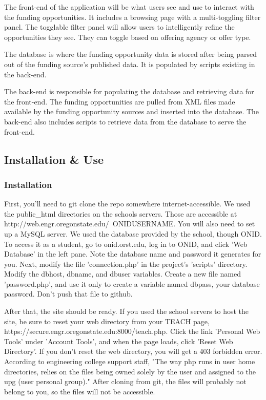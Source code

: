 \documentclass[onecolumn]{IEEEtran}
\begin{document}
The front-end of the application will be what users see and use to interact with the funding opportunities. It includes a browsing page with a multi-toggling filter panel. The togglable filter panel will allow users to intelligently refine the opportunities they see. They can toggle based on offering agency or offer type. 

The database is where the funding opportunity data is stored after being parsed out of the funding source's published data. It is populated by scripts existing in the back-end. 

The back-end is responsible for populating the database and retrieving data for the front-end. The funding opportunities are pulled from XML files made available by the funding opportunity sources and inserted into the database. The back-end also includes scripts to retrieve data from the database to serve the front-end. 

\subsection{Installation \& Use}
\subsubsection{Installation}
First, you'll need to git clone the repo somewhere internet-accessible. We used the public\_html directories on the schools servers. Those are accessible at http://web.engr.oregonstate.edu/~ONIDUSERNAME. You will also need to set up a MySQL server. We used the database provided by the school, though ONID. To access it as a student, go to onid.orst.edu, log in to ONID, and click 'Web Database' in the left pane. Note the database name and password it generates for you. Next, modify the file 'connection.php' in the project's 'scripts' directory. Modify the dbhost, dbname, and dbuser variables. Create a new file named 'password.php', and use it only to create a variable named dbpass, your database password. Don't push that file to github.  

After that, the site should be ready. If you used the school servers to host the site, be sure to reset your web directory from your TEACH page, https://secure.engr.oregonstate.edu:8000/teach.php. Click the link 'Personal Web Tools' under 'Account Tools', and when the page loads, click 'Reset Web Directory'. If you don't reset the web directory, you will get a 403 forbidden error. According to engineering college support staff, "The way php runs in user home directories, relies on the files being owned solely by the user and assigned to the upg (user personal group)." After cloning from git, the files will probably not belong to you, so the files will not be accessible. 
\end{document}
